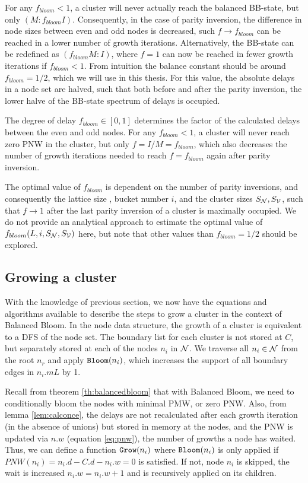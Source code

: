 For any $f_{bloom} < 1$, a cluster will never actually reach the balanced BB-state, but only $(M:f_{bloom}I)$. Consequently, in the case of parity inversion, the difference in node sizes between even and odd nodes is decreased, such $f\to f_{bloom}$ can be reached in a lower number of growth iterations. Alternatively, the BB-state can be redefined as $(f_{bloom}M:I)$, where $f=1$ can now be reached in fewer growth iterations if $f_{bloom} <1$.  From intuition the balance constant should be around $f_{bloom} = 1/2$, which we will use in this thesis. For this value, the absolute delays in a node set are halved, such that both before and after the parity inversion, the lower halve of the BB-state spectrum of delays is occupied.
\begin{theorem}
  The degree of delay $f_{bloom} \in [0, 1]$ determines the factor of the calculated delays between the even and odd nodes. For any $f_{bloom} < 1$, a cluster will never reach zero PNW in the cluster, but only $f=I/M=f_{bloom}$, which also decreases the number of growth iterations needed to reach $f=f_{bloom}$ again after parity inversion.
\end{theorem}

The optimal value of $f_{bloom}$ is dependent on the number of parity inversions, and consequently the lattice size , bucket number $i$, and the cluster sizes $S_{\mathcal{N}}, S_{\mathcal{V}}$, such that $f\to1$ after the last parity inversion of a cluster is maximally occupied. We do not provide an analytical approach to estimate the optimal value of $f_{bloom}(L, i, S_{\mathcal{N}}, S_{\mathcal{V}})$ here, but note that other values than $f_{bloom} = 1/2$ should be explored. \\

\subsection{Growing a cluster}\label{sec:growingcluster}
With the knowledge of previous section, we now have the equations and algorithms available to describe the steps to grow a cluster in the context of Balanced Bloom. In the node data structure, the growth of a cluster is equivalent to a DFS of the node set. The boundary list for each cluster is not stored at $C$, but separately stored at each of the nodes $n_i$ in $\mathcal{N}$. We traverse all $n_i \in \mathcal{N}$ from the root $n_r$ and apply $\texttt{Bloom}(n_i)$, which increases the support of all boundary edges in $n_i.m{L}$ by 1.

Recall from theorem \ref{th:balancedbloom} that with Balanced Bloom, we need to conditionally bloom the nodes with minimal PMW, or zero PNW. Also, from lemma \ref{lem:calconce}, the delays are not recalculated after each growth iteration (in the absence of unions) but stored in memory at the nodes, and the PNW is updated via $n.w$ (equation \eqref{eq:pnw}), the number of growths a node has waited. Thus, we can define a function $\texttt{Grow}(n_i)$ where $\texttt{Bloom}(n_i)$ is only applied if $PNW(n_i) = n_i.d - C.d - n_i.w = 0$ is satisfied. If not, node $n_i$ is skipped, the wait is increased $n_i.w = n_i.w +1$ and  is recursively applied on its children.

